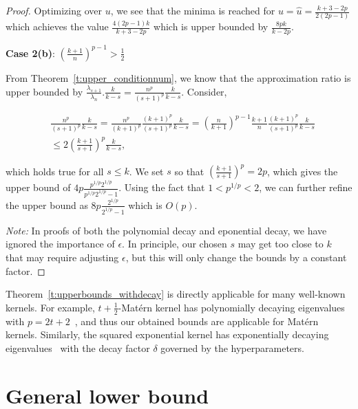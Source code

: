 \documentclass{article}
\begin{document}
\begin{proof}
	Optimizing over $u$, we see that the minima is reached for $u = \hat{u} = \frac{k+3-2p}{2(2p-1)}$ which achieves the value $ \frac{4(2p-1)k}{   k+3 -2 p}$ which is upper bounded by $\frac{8pk}{k-2p}$.
	
	\bigskip 
	\textbf{Case 2(b)}: $\left(\frac{k+1}{n}\right)^{p-1} > \frac{1}{2}$

	From Theorem~\ref{t:upper_conditionnum}, we know that the approximation ratio is upper bounded by $\frac{\lambda_{s+1}}{\lambda_n}.\frac{k}{k-s} = \frac{n^p}{(s+1)^p}\frac{k}{k-s} $. Consider, 
	
	\begin{align*}
	&\frac{n^p}{(s+1)^p}\frac{k}{k-s} = \frac{n^p}{(k+1)^p} \frac{{(k+1)^p}}{{(s+1)^p}} \frac{k}{k-s} = \left(\frac{n}{k+1}\right)^{p-1} \frac{k+1}{n}\frac{{(k+1)^p}}{{(s+1)^p}} \frac{k}{k-s}\\ 
	& \leq 2 \left(\frac{k+1}{s+1}\right)^p \frac{k}{k-s},
	\end{align*}
	
	which holds true for all $s \leq k$. We set $s$ so that $\left(\frac{k+1}{s+1}\right)^p = 2p$, which gives the upper bound of $4p\frac{p^{1/p}2^{1/p}}{p^{1/p}2^{1/p}-1} $. Using the fact that $1 < p^{1/p}<2$, we can further refine the upper bound as $8p\frac{2^{1/p}}{2^{1/p}-1}$ which is $O(p)$.
	
	\emph{Note:} In proofs of both the polynomial decay and eponential decay, we have ignored the importance of $\epsilon$. In principle, our chosen $s$ may get too close to $k$ that may require adjusting $\epsilon$, but this will only change the bounds by a constant factor.
	
 \end{proof}

Theorem~\ref{t:upperbounds_withdecay} is directly applicable for many well-known kernels. For example, $t+\frac{1}{2}$-Mat\'ern kernel has polynomially decaying eigenvalues with $p=2t+2$~\cite{Ritter1995Mattern}, and thus our obtained bounds are applicable for Mat\'ern kernels. Similarly, the squared exponential kernel has exponentially decaying eigenvalues~\cite{Zhu1997GaussianRA} with the decay factor $\delta$ governed by the hyperparameters.

\section{General lower bound}
\end{document}
